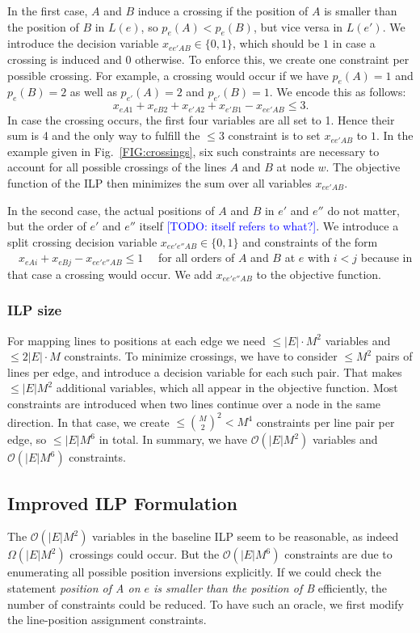 \documentclass{llncs}
\newcommand\TODO[1]{\textcolor{blue}{\small [TODO: #1]}}
\begin{document}
In the first case, $A$ and $B$ induce a crossing if the position of $A$ is smaller than the position of $B$ in $L(e)$, so $p_e(A) < p_e(B)$, but vice versa in $L(e')$. We introduce the decision variable $x_{ee'AB} \in \{0,1\}$, which should be $1$ in case a crossing is induced and $0$ otherwise. To enforce this, we create one constraint per possible crossing. For example, a crossing would occur if we have $p_e(A)=1$ and $p_e(B)=2$ as well as $p_{e'}(A)=2$ and $p_{e'}(B) =1$. We encode this as follows:
\begin{equation*}
	x_{eA1} + x_{eB2} + x_{e'A2} + x_{e'B1} - x_{ee'AB} \leq 3.
\end{equation*}
In case the crossing occurs, the first four variables are all set to 1. Hence their sum is 4 and the only way to fulfill the $\leq 3$ constraint is to set $x_{ee'AB}$ to $1$. In the example given in Fig.~\ref{FIG:crossings}, six such constraints are necessary to account for all possible crossings of the lines $A$ and $B$ at node $w$.
The objective function of the ILP then minimizes the sum over all variables $x_{ee'AB}$.

In the second case, the actual positions of $A$ and $B$ in $e'$ and $e''$ do not matter, but the order of $e'$ and $e''$ itself \TODO{itself refers to what?}. We introduce a split crossing decision variable $x_{ee'e''AB} \in \{0,1\}$ and constraints of the form
$\quad x_{eAi} + x_{eBj} - x_{ee'e''AB} \leq 1 \quad$
for all orders of $A$ and $B$ at $e$ with $i < j$ because in that case a crossing would occur.
We add $x_{ee'e''AB}$ to the objective function.

\subsubsection{ILP size}
For mapping lines to positions at each edge we need $\leq |E| \cdot M^{2}$ variables and $\leq 2|E| \cdot M$ constraints. To minimize crossings, we have to consider $\leq M^{2}$ pairs of lines per edge, and introduce a decision variable for each such pair. That makes $\leq |E| M^{2}$ additional variables, which all appear in the objective function. Most constraints are introduced when two lines continue over a node in the same direction. In that case, we create $\leq \binom{M}{2}^{2} < M^{4}$ constraints per line pair per edge, so $\leq |E| M^{6}$ in total.
In summary, we have $\mathcal{O}(|E|M^{2})$ variables and $\mathcal{O}(|E|M^{6})$ constraints.

%
\subsection{Improved ILP Formulation}\label{SEC:improved}
%
The $\mathcal{O}(|E|M^{2})$ variables in the baseline ILP seem to be reasonable, as indeed $\Omega(|E|M^{2})$ crossings could occur. But the $\mathcal{O}(|E|M^{6})$ constraints are due to enumerating all possible position inversions explicitly. If we could check the statement \emph{position of A on $e$ is smaller than the position of B} efficiently, the number of constraints could be reduced. To have such an oracle, we first modify the line-position assignment constraints.
\end{document}
